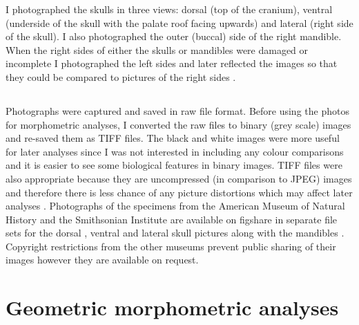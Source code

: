 	I photographed the skulls in three views: dorsal (top of the cranium), ventral (underside of the skull with the palate roof facing upwards) and lateral (right side of the skull). I also photographed the outer (buccal) side of the right mandible. When the right sides of either the skulls or mandibles were damaged or incomplete I photographed the left sides and later reflected the images so that they could be compared to pictures of the right sides \citep[e.g.][]{Barrow2008}.


\subsection{}
	Photographs were captured and saved in raw file format. Before using the photos for morphometric analyses, I converted the raw files to binary (grey scale) images and re-saved them as TIFF files. The black and white images were more useful for later analyses since I was not interested in including any colour comparisons and it is easier to see some biological features in binary images. TIFF files were also appropriate because they are uncompressed (in comparison to JPEG) images and therefore there is less chance of any picture distortions which may affect later analyses \citep{RHOI2013}.
	Photographs of the specimens from the American Museum of Natural History and the Smithsonian Institute are available on figshare in separate file sets for the dorsal \citep{Finlay2013d}, ventral \citep{Finlay2013v} and lateral \citep{Finlay2013l} skull pictures along with the mandibles \citep{Finlay2013m}. Copyright restrictions from the other museums prevent public sharing of their images however they are available on request.
	


\section{Geometric morphometric analyses}
\label{sect:morphometrics}

\subsection{}


